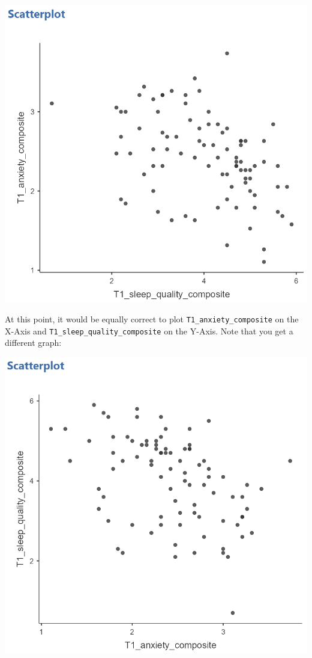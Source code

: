 \documentclass[
]{book}
\begin{document}
\includegraphics{img/Scatterplot_SQandAnx.png}

At this point, it would be equally correct to plot \texttt{T1\_anxiety\_composite} on the X-Axis and \texttt{T1\_sleep\_quality\_composite} on the Y-Axis. Note that you get a different graph:

\includegraphics{img/Scatterplot_AnxandSQ.png}
\end{document}
